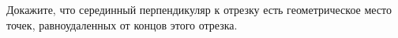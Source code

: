 \begin{ex}
	\begin{condition}
		Докажите, что серединный перпендикуляр к отрезку есть геометрическое место точек, равноудаленных от концов этого отрезка.
	\end{condition}
\end{ex}
